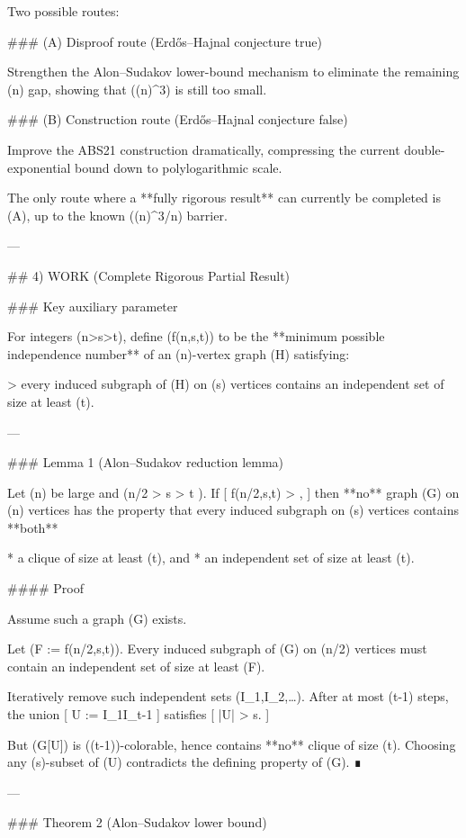 Two possible routes:

### (A) Disproof route (Erdős–Hajnal conjecture true)

Strengthen the Alon–Sudakov lower-bound mechanism to eliminate the remaining (\log\log n) gap, showing that ((\log n)^3) is still too small.

### (B) Construction route (Erdős–Hajnal conjecture false)

Improve the ABS21 construction dramatically, compressing the current double-exponential bound down to polylogarithmic scale.

The only route where a **fully rigorous result** can currently be completed is (A), up to the known ((\log n)^3/\log\log n) barrier.

---

## 4) WORK (Complete Rigorous Partial Result)

### Key auxiliary parameter

For integers (n>s>t), define (f(n,s,t)) to be the **minimum possible independence number** of an (n)-vertex graph (H) satisfying:

> every induced subgraph of (H) on (s) vertices contains an independent set of size at least (t).

---

### Lemma 1 (Alon–Sudakov reduction lemma)

Let (n) be large and (n/2 > s > t ).
If
[
f(\lfloor n/2\rfloor,s,t) > ,
]
then **no** graph (G) on (n) vertices has the property that every induced subgraph on (s) vertices contains **both**

* a clique of size at least (t), and
* an independent set of size at least (t).

#### Proof

Assume such a graph (G) exists.

Let (F := f(\lfloor n/2\rfloor,s,t)).
Every induced subgraph of (G) on (\lfloor n/2\rfloor) vertices must contain an independent set of size at least (F).

Iteratively remove such independent sets (I_1,I_2,\dots).
After at most (t-1) steps, the union
[
U := I_1\cup\cdots\cup I_{t-1}
]
satisfies
[
|U| \ge {} > s.
]

But (G[U]) is ((t-1))-colorable, hence contains **no** clique of size (t).
Choosing any (s)-subset of (U) contradicts the defining property of (G). ∎

---

### Theorem 2 (Alon–Sudakov lower bound)

